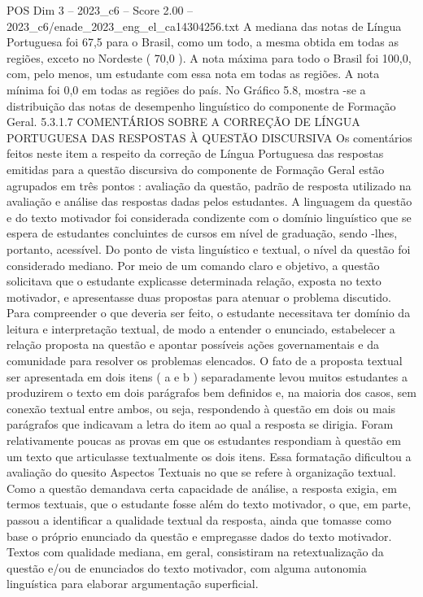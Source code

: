 \begin{textsample}{POS Dim 3 – 2023\_c6 – Score 2.00 – 2023\_c6/enade\_2023\_eng\_el\_ca14304256.txt}
A mediana das notas de Língua Portuguesa foi 67,5 para o Brasil, como um todo, a mesma obtida em todas as regiões, exceto no Nordeste ( 70,0 ).
A nota máxima para todo o Brasil foi 100,0, com, pelo menos, um estudante com essa nota em todas as regiões.
A nota mínima foi 0,0 em todas as regiões do país.
No Gráfico 5.8, mostra -se a distribuição das notas de desempenho linguístico do componente de Formação Geral. 5.3.1.7 COMENTÁRIOS SOBRE A CORREÇÃO DE LÍNGUA PORTUGUESA DAS RESPOSTAS À QUESTÃO DISCURSIVA Os comentários feitos neste item a respeito da correção de Língua Portuguesa das respostas emitidas para a questão discursiva do componente de Formação Geral estão agrupados em três pontos : avaliação da questão, padrão de resposta utilizado na avaliação e análise das respostas dadas pelos estudantes.
A linguagem da questão e do texto motivador foi considerada condizente com o domínio linguístico que se espera de estudantes concluintes de cursos em nível de graduação, sendo -lhes, portanto, acessível.
Do ponto de vista linguístico e textual, o nível da questão foi considerado mediano.
Por meio de um comando claro e objetivo, a questão solicitava que o estudante explicasse determinada relação, exposta no texto motivador, e apresentasse duas propostas para atenuar o problema discutido.
Para compreender o que deveria ser feito, o estudante necessitava ter domínio da leitura e interpretação textual, de modo a entender o enunciado, estabelecer a relação proposta na questão e apontar possíveis ações governamentais e da comunidade para resolver os problemas elencados.
O fato de a proposta textual ser apresentada em dois itens ( a e b ) separadamente levou muitos estudantes a produzirem o texto em dois parágrafos bem definidos e, na maioria dos casos, sem conexão textual entre ambos, ou seja, respondendo à questão em dois ou mais parágrafos que indicavam a letra do item ao qual a resposta se dirigia.
Foram relativamente poucas as provas em que os estudantes respondiam à questão em um texto que articulasse textualmente os dois itens.
Essa formatação dificultou a avaliação do quesito Aspectos Textuais no que se refere à organização textual.
Como a questão demandava certa capacidade de análise, a resposta exigia, em termos textuais, que o estudante fosse além do texto motivador, o que, em parte, passou a identificar a qualidade textual da resposta, ainda que tomasse como base o próprio enunciado da questão e empregasse dados do texto motivador.
Textos com qualidade mediana, em geral, consistiram na retextualização da questão e/ou de enunciados do texto motivador, com alguma autonomia linguística para elaborar argumentação superficial.

\end{textsample}
